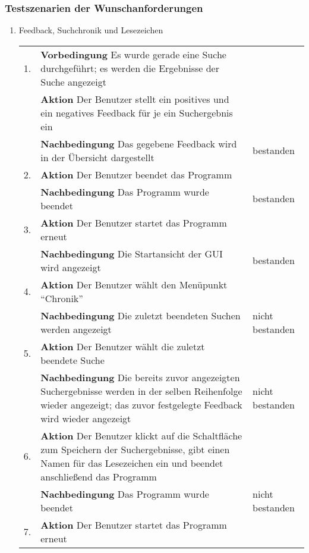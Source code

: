 \subsubsection{Testszenarien der Wunschanforderungen}
\begin{enumerate} [label=\bfseries /TSW \arabic*0/, leftmargin=*]
	\item Feedback, Suchchronik und Lesezeichen \label{ts:feedback_chronik_lesezeichen} \newline \newline
	\begin{tabular}{rp{4in}|l}
	1. & \textbf{Vorbedingung} Es wurde gerade eine Suche durchgeführt; es werden die Ergebnisse der Suche angezeigt & \\
	   & \textbf{Aktion} Der Benutzer stellt ein positives und ein negatives Feedback für je ein Suchergebnis ein & \\
	   & \textbf{Nachbedingung} Das gegebene Feedback wird in der Übersicht dargestellt & bestanden \\
	\hline
	2. & \textbf{Aktion} Der Benutzer beendet das Programm & \\
	   & \textbf{Nachbedingung} Das Programm wurde beendet & bestanden \\
	\hline
	3. & \textbf{Aktion} Der Benutzer startet das Programm erneut & \\
	   & \textbf{Nachbedingung} Die Startansicht der GUI wird angezeigt & bestanden \\
	\hline	
	4. & \textbf{Aktion} Der Benutzer wählt den Menüpunkt \enquote{Chronik} & \\
	   & \textbf{Nachbedingung} Die zuletzt beendeten Suchen werden angezeigt & nicht bestanden \\
	\hline
	5. & \textbf{Aktion} Der Benutzer wählt die zuletzt beendete Suche & \\
	   & \textbf{Nachbedingung} Die bereits zuvor angezeigten Suchergebnisse werden in der selben Reihenfolge wieder angezeigt; das zuvor festgelegte Feedback wird wieder angezeigt & nicht bestanden \\
	\hline
	6. & \textbf{Aktion} Der Benutzer klickt auf die Schaltfläche zum Speichern der Suchergebnisse, gibt einen Namen für das Lesezeichen ein und beendet anschließend das Programm & \\
	   & \textbf{Nachbedingung} Das Programm wurde beendet & nicht bestanden \\
	\hline
	7. & \textbf{Aktion} Der Benutzer startet das Programm erneut & \\

\end{tabular}
\end{enumerate}
